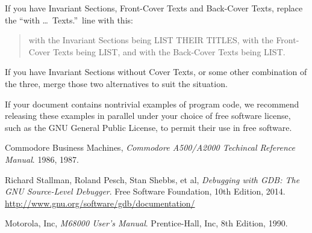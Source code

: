 \documentclass[a4paper]{report}
\begin{document}
If you have Invariant Sections, Front-Cover Texts and Back-Cover Texts,
replace the ``with \dots\ Texts.''\ line with this:

\bigskip
\begin{quote}
    with the Invariant Sections being LIST THEIR TITLES, with the
    Front-Cover Texts being LIST, and with the Back-Cover Texts being LIST.
\end{quote}
\bigskip
    
If you have Invariant Sections without Cover Texts, or some other
combination of the three, merge those two alternatives to suit the
situation.

If your document contains nontrivial examples of program code, we
recommend releasing these examples in parallel under your choice of
free software license, such as the GNU General Public License,
to permit their use in free software.

\begin{thebibliography}{9}

  Commodore Business Machines,
  \emph{Commodore A500/A2000 Techincal Reference Manual}.
  1986, 1987.

  Richard Stallman, Roland Pesch, Stan Shebbs, et al, 
  \emph{Debugging with GDB: The GNU Source-Level Debugger}.
  Free Software Foundation,
  10th Edition,
  2014.
  \url{http://www.gnu.org/software/gdb/documentation/}

  Motorola, Inc,
  \emph{M68000 User's Manual}.
  Prentice-Hall, Inc,
  8th Edition,
  1990.

\end{thebibliography}
\end{document}
